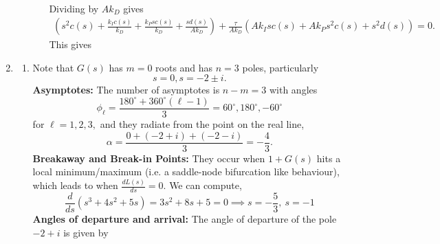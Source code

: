 \documentclass{article}
\newcommand*\widefbox[1]{\fbox{\hspace{2em}#1\hspace{2em}}}
\begin{document}
\begin{enumerate}[label=\textbf{3.\arabic*}]
\begin{enumerate}[label=(\alph*)]
\begin{enumerate}[label=(\roman*)]
\begin{align}
        \end{align}
        Dividing by $Ak_D$ gives 
        \begin{align}
            \left(s^{2} c{(s)} + \frac{k_{I} c{(s)}}{k_{D}} + \frac{k_{P} s c{(s)}}{k_{D}} + \frac{s d{(s)}}{A k_{D}}\right) + \frac{\tau}{Ak_D}\left(A k_{I} s  c{(s)} +  A k_{P} s^{2}  c{(s)}  + s^{2}  d{(s)}\right) = 0.
        \end{align}
        This gives 
    \end{enumerate}
\end{enumerate}
\item \begin{enumerate}[label=(\alph*)]
    \item Note that $G(s)$ has $m=0$ roots and has $n=3$ poles, particularly 
    \begin{equation}
        s=0, s = -2 \pm i.
    \end{equation}
    \textbf{Asymptotes:} The number of asymptotes is $n-m=3$ with angles 
    \begin{equation}
        \phi_\ell = \frac{180^\circ + 360^\circ (\ell-1)}{3} = \boxed{60^\circ, 180^\circ, -60^\circ}
    \end{equation}
    for $\ell = 1,2,3,$ and they radiate from the point on the real line,
    \begin{equation}
        \alpha =  \frac{0+(-2+i)+(-2-i)}{3} = \boxed{-\frac{4}{3}}.
    \end{equation}
    \textbf{Breakaway and Break-in Points:} They occur when $1+G(s)$ hits a local minimum/maximum (i.e. a saddle-node bifurcation like behaviour), which leads to when $\frac{dL(s)}{ds}=0.$ We can compute,
    \begin{equation}
        \frac{d}{ds}\left(s^3+4s^2+5s\right) = 3 s^{2} + 8 s + 5 =0 \implies \boxed{ s = - \frac{5}{3}, \  s = -1}
    \end{equation}
    \textbf{Angles of departure and arrival:} The angle of departure of the pole $-2+i$ is given by 

\end{enumerate}
\end{enumerate}
\end{document}
